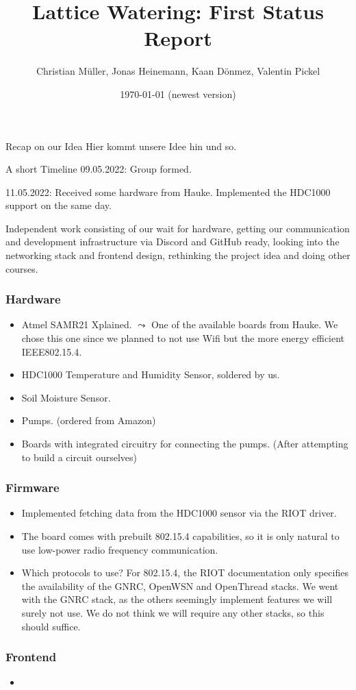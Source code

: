 \documentclass[10pt, xcolor=svgnames]{beamer}
\title{Lattice Watering: First Status Report}
\author{Christian Müller, Jonas Heinemann, Kaan Dönmez, Valentin Pickel}
\institute{
    Software Project on Internet Communication

    Summer Term 2022
    
    Freie Universität Berlin

    Institute for Computer Science
}
\date{\today{ }(newest version)}
\begin{document}
\maketitle

\begin{frame}{Recap on our Idea}
    Hier kommt unsere Idee hin und so.
\end{frame}

\begin{frame}{A short Timeline}
    09.05.2022: Group formed.

    \vspace*{0.25cm}

    11.05.2022: Received some hardware from Hauke. Implemented the HDC1000 support on the same day.

    \vspace*{0.25cm}

    Independent work consisting of our wait for hardware, getting our communication and development infrastructure via Discord and GitHub ready, looking into the networking stack and frontend design, rethinking the project idea and doing other courses.

    \vspace*{0.25cm}
\end{frame}

\begin{frame}
    \frametitle{Hardware}

    \begin{itemize}
        \item Atmel SAMR21 Xplained. \(\leadsto\) One of the available boards from Hauke. We chose this one since we planned to not use Wifi but the more energy efficient IEEE802.15.4.
        \item HDC1000 Temperature and Humidity Sensor, soldered by us.
        \item Soil Moisture Sensor.
        \item Pumps. (ordered from Amazon)
        \item Boards with integrated circuitry for connecting the pumps. (After attempting to build a circuit ourselves)
    \end{itemize}
\end{frame}

\begin{frame}
    \frametitle{Firmware}

    \begin{itemize}
        \item Implemented fetching data from the HDC1000 sensor via the RIOT driver.
        \item The board comes with prebuilt 802.15.4 capabilities, so it is only natural to use low-power radio frequency communication.
        \item Which protocols to use? For 802.15.4, the RIOT documentation only specifies the availability of the GNRC, OpenWSN and OpenThread stacks. We went with the GNRC stack, as the others seemingly implement features we will surely not use. We do not think we will require any other stacks, so this should suffice.
    \end{itemize}
\end{frame}

\begin{frame}
    \frametitle{Frontend}

    \begin{itemize}
        \item
    \end{itemize}
\end{frame}
\end{document}
